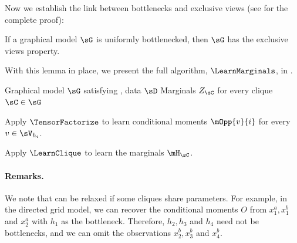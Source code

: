 Now we establish the link between bottlenecks and exclusive views
(see  for the complete proof):
\begin{lemma}
  \label{lem:bottleneck-views}  
If a graphical model $\sG$ is uniformly bottlenecked,
then $\sG$ has the exclusive views property.
\end{lemma}

With this lemma in place, we present the full algorithm, $\LearnMarginals$,
in .

\begin{algorithm}
  \caption{\LearnMarginals}
  \label{algo:directed}
  \begin{algorithmic}
    \REQUIRE Graphical model $\sG$ satisfying , data $\sD$
    \ENSURE Marginals $Z_\sC$ for every clique $\sC \in \sG$

        \STATE Apply $\TensorFactorize$ to learn conditional moments
        $\mOpp{v}{i}$ for every $v \in \sV_{h_i}$.

      \ENDFOR
\STATE Apply $\LearnClique$ to learn the marginals $\mH_\sC$.
\ENDFOR
  \end{algorithmic}
\end{algorithm}



\paragraph{Remarks.} We note that  can be relaxed if some cliques
  share parameters.
For example, in the directed grid model, we can recover the conditional moments $O$ from
  $x^a_1, x^b_1$ and $x^a_2$ with $h_1$ as the bottleneck.
  Therefore, $h_2, h_3$ and $h_4$
  need not be bottlenecks, and we can omit the observations $x^b_2, x^b_3$ and $x^b_4$.

